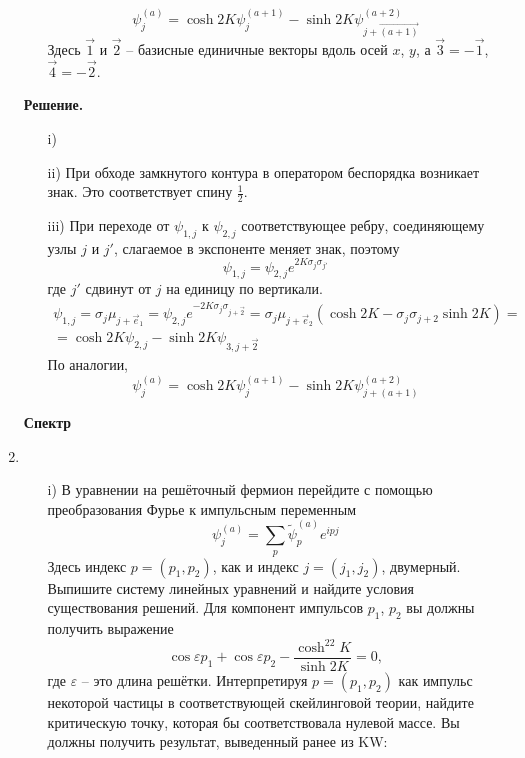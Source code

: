 \documentclass[12pt]{article}
\theoremstyle{definition}
\begin{document}
\begin{enumerate}
\begin{itemize}
    \begin{equation}
        \psi^{(a)}_j=\cosh2K\psi^{(a+1)}_j-\sinh2K\psi^{(a+2)}_{j+\vec{(a+1)}}
    \end{equation}
    Здесь $\vec{1}$ и $\vec{2}$ -- базисные единичные векторы вдоль осей $x$, $y$, а $\vec{3}=-\vec{1}$, $\vec{4}=-\vec{2}$.
\end{itemize}
\textbf{Решение.}
\begin{itemize}
    \item[i)]
    \item[ii)] При обходе замкнутого контура в оператором беспорядка возникает знак. Это соответствует спину $\frac{1}{2}$.
    \item[iii)] При переходе от $\psi_{1,j}$ к $\psi_{2,j}$ соответствующее ребру, соединяющему узлы $j$ и $j'$, слагаемое в экспоненте меняет знак, поэтому
    \begin{equation}
        \boxed{\psi_{1,j}=\psi_{2,j}e^{2K\sigma_j\sigma_{j'}}}
    \end{equation}
    где $j'$ сдвинут от $j$ на единицу по вертикали.
    \begin{multline}
        \psi_{1,j}=\sigma_j\mu_{j+\vec{e}_1}=\psi_{2,j}e^{-2K\sigma_j\sigma_{j+\vec{2}}}=\sigma_j\mu_{j+\vec{e}_2}(\cosh2K-\sigma_j\sigma_{j+2}\sinh2K)=\\=\cosh2K\psi_{2,j}-\sinh2K\psi_{3,j+\vec{2}}
    \end{multline}
    По аналогии,
    \begin{equation}
        \boxed{\psi^{(a)}_j=\cosh2K\psi^{(a+1)}_j-\sinh2K\psi^{(a+2)}_{j+(a+1)}}
    \end{equation}
\end{itemize}
\textbf{Спектр}
\item
\begin{itemize}
    \item[i)] В уравнении на решёточный фермион перейдите с помощью преобразования Фурье к импульсным переменным
    \begin{equation}
        \psi^{(a)}_j=\sum\limits_p\tilde\psi_p^{(a)}e^{ipj}
    \end{equation}
    Здесь индекс $p=(p_1,p_2)$, как и индекс $j=(j_1,j_2)$, двумерный. Выпишите систему линейных уравнений и найдите условия существования решений. Для компонент импульсов $p_1$, $p_2$ вы должны получить выражение
    \begin{equation}
        \cos\varepsilon p_1+\cos\varepsilon p_2-\frac{\cosh^22K}{\sinh2K}=0,
    \end{equation}
    где $\varepsilon$ -- это длина решётки. Интерпретируя $p=(p_1,p_2)$ как импульс некоторой частицы в соответствующей скейлинговой теории, найдите критическую точку, которая бы соответствовала нулевой массе. Вы должны получить результат, выведенный ранее из KW:

\end{itemize}
\end{enumerate}
\end{document}
